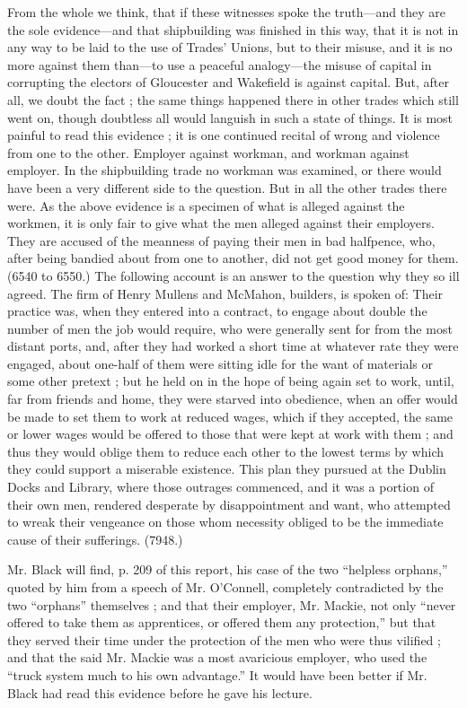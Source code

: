 From the whole we think, that if these witnesses spoke the truth---and
they are the sole evidence---and that shipbuilding was finished in this
way, that it is not in any way to be laid to the use of Trades' Unions,
but to their misuse, and it is no more against them than---to use a
peaceful analogy---the misuse of capital in corrupting the electors of
Gloucester and Wakefield is against capital. But, after all, we doubt
the fact ; the same things happened there in other trades which still
went on, though doubtless all would languish in such a state of things.
It is most painful to read this evidence ; it is one continued recital
of wrong and violence from one to the other. Employer against workman,
and workman against employer. In the shipbuilding trade no workman was
examined, or there would have been a very different side to the
question. But in all the other trades there were. As the above evidence
is a specimen of what is alleged against the workmen, it is only fair to
give what the men alleged against their employers. They are accused of
the meanness of paying their men in bad halfpence, who, after being
bandied about from one to another, did not get good money for them.
(6540 to 6550.) The following account is an answer to the question why
they so ill agreed. The firm of Henry Mullens and McMahon, builders, is
spoken of: Their practice was, when they entered into a contract, to
engage about double the number of men the job would require, who were
generally sent for from the most distant ports, and, after they had
worked a short time at whatever rate they were engaged, about one-half
of them were sitting idle for the want of materials or some other
pretext ; but he held on in the hope of being again set to work, until,
far from friends and home, they were starved into obedience, when an
offer would be made to set them to work at reduced wages, which if they
accepted, the same or lower wages would be offered to those that were
kept at work with them ; and thus they would oblige them to reduce each
other to the lowest terms by which they could support a miserable
existence. This plan they pursued at the Dublin Docks and Library, where
those outrages commenced, and it was a portion of their own men,
rendered desperate by disappointment and want, who attempted to wreak
their vengeance on those whom necessity obliged to be the immediate
cause of their sufferings. (7948.)

Mr. Black will find, p. 209 of this report, his case of the two
``helpless orphans,'' quoted by him from a speech of Mr. O'Connell,
completely contradicted by the two ``orphans'' themselves ; and that
their employer, Mr. Mackie, not only ``never offered to take them as
apprentices, or offered them any protection,'' but that they served
their time under the protection of the men who were thus vilified ; and
that the said Mr. Mackie was a most avaricious employer, who used the
``truck system much to his own advantage.'' It would have been better if
Mr. Black had read this evidence before he gave his lecture.

